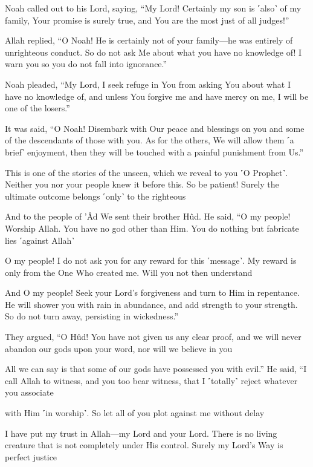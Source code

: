 Noah called out to his Lord, saying, “My Lord! Certainly my son is ˹also˺ of my family, Your promise is surely true, and You are the most just of all judges!”

Allah replied, “O Noah! He is certainly not of your family—he was entirely of unrighteous conduct. So do not ask Me about what you have no knowledge of! I warn you so you do not fall into ignorance.”

Noah pleaded, “My Lord, I seek refuge in You from asking You about what I have no knowledge of, and unless You forgive me and have mercy on me, I will be one of the losers.”

It was said, “O Noah! Disembark with Our peace and blessings on you and some of the descendants of those with you. As for the others, We will allow them ˹a brief˺ enjoyment, then they will be touched with a painful punishment from Us.”

This is one of the stories of the unseen, which we reveal to you ˹O Prophet˺. Neither you nor your people knew it before this. So be patient! Surely the ultimate outcome belongs ˹only˺ to the righteous

And to the people of ’Âd We sent their brother Hûd. He said, “O my people! Worship Allah. You have no god other than Him. You do nothing but fabricate lies ˹against Allah˺

O my people! I do not ask you for any reward for this ˹message˺. My reward is only from the One Who created me. Will you not then understand

And O my people! Seek your Lord’s forgiveness and turn to Him in repentance. He will shower you with rain in abundance, and add strength to your strength. So do not turn away, persisting in wickedness.”

They argued, “O Hûd! You have not given us any clear proof, and we will never abandon our gods upon your word, nor will we believe in you

All we can say is that some of our gods have possessed you with evil.” He said, “I call Allah to witness, and you too bear witness, that I ˹totally˺ reject whatever you associate

with Him ˹in worship˺. So let all of you plot against me without delay

I have put my trust in Allah—my Lord and your Lord. There is no living creature that is not completely under His control. Surely my Lord’s Way is perfect justice

